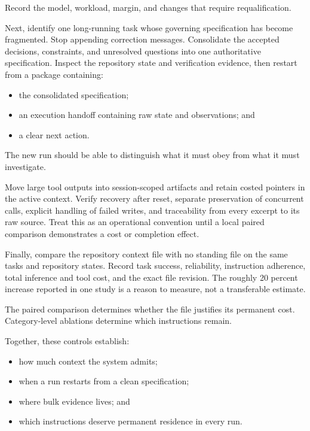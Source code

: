 Record the model, workload, margin, and changes that require requalification.


Next, identify one long-running task whose governing specification has become fragmented. Stop appending correction messages. Consolidate the accepted decisions, constraints, and unresolved questions into one authoritative specification. Inspect the repository state and verification evidence, then restart from a package containing:

\begin{itemize}
\tightlist
\item
  the consolidated specification;
\item
  an execution handoff containing raw state and observations; and
\item
  a clear next action.
\end{itemize}

The new run should be able to distinguish what it must obey from what it must investigate.

Move large tool outputs into session-scoped artifacts and retain costed pointers in the active context. Verify recovery after reset, separate preservation of concurrent calls, explicit handling of failed writes, and traceability from every excerpt to its raw source. Treat this as an operational convention until a local paired comparison demonstrates a cost or completion effect.

Finally, compare the repository context file with no standing file on the same tasks and repository states. Record task success, reliability, instruction adherence, total inference and tool cost, and the exact file revision. The roughly 20 percent increase reported in one study is a reason to measure, not a transferable estimate.

The paired comparison determines whether the file justifies its permanent cost. Category-level ablations determine which instructions remain.


Together, these controls establish:

\begin{itemize}
\tightlist
\item
  how much context the system admits;
\item
  when a run restarts from a clean specification;
\item
  where bulk evidence lives; and
\item
  which instructions deserve permanent residence in every run.
\end{itemize}

